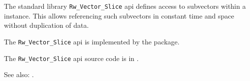 
The standard library {\tt Rw\_Vector\_Slice} api defines access to subvectors within a 
 instance.  This allows referencing such subvectors in 
constant time and space without duplication of data.

The {\tt Rw\_Vector\_Slice} api is implemented by the  package.

The {\tt Rw\_Vector\_Slice} api source code is in .


See also: .





